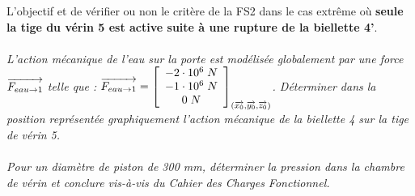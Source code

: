 \documentclass[11pt,oneside]{article}
\begin{document}
L'objectif et de vérifier ou non le critère de la FS2 dans le cas extrême où \textbf{seule la tige du vérin 5 est active suite à une rupture de la biellette 4'}.

\paragraph{} 
\textit{L'action mécanique de l'eau sur la porte est modélisée globalement par une force $\overrightarrow{F_{eau\rightarrow 1}}$ telle que : $\overrightarrow{F_{eau\rightarrow 1}}=\left[\begin{array}{c}
-2\cdot10^{6}\; N \\
-1\cdot10^{6}\; N \\ 
0\; N 
\end{array}\right]_{(\overrightarrow{x_0},\overrightarrow{y_0},\overrightarrow{z_0})}$. Déterminer dans la position représentée graphiquement l'action mécanique de la biellette 4 sur la tige de vérin 5.}

\paragraph{} 
\textit{Pour un diamètre de piston de 300\; mm, déterminer la pression dans la chambre de vérin et conclure vis-à-vis du Cahier des Charges Fonctionnel.}
\end{document}
